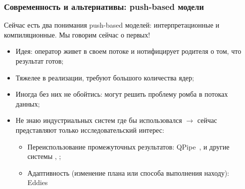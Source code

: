 \documentclass{beamer}
\begin{document}
\begin{frame}[fragile]
	\frametitle{Современность и альтернативы: push-based модели}
	Сейчас есть два понимания push-based моделей: интерпретационные и компиляционные. Мы говорим сейчас о первых!

	\begin{itemize}
		\item Идея: оператор живет в своем потоке и нотифицирует родителя о том, что результат готов;
		\item Тяжелее в реализации, требуют большого количества ядер;
		\item Иногда без них не обойтись: могут решить проблему ромба в потоках данных;
		\item Не знаю индустриальных систем где бы использовался $\longrightarrow$ сейчас представляют только исследовательский интерес:
		\begin{itemize}
			\item Переиспользование промежуточных результатов: QPipe~\cite{qpipe1}, \cite{qpipe2} и другие системы \cite{sharing1}, \cite{sharing2};
			\item Адаптивность (изменение плана или способа выполнения находу): Eddies~\cite{eddies}
		\end{itemize}
		
	\end{itemize}
	
\end{frame}
\end{document}
